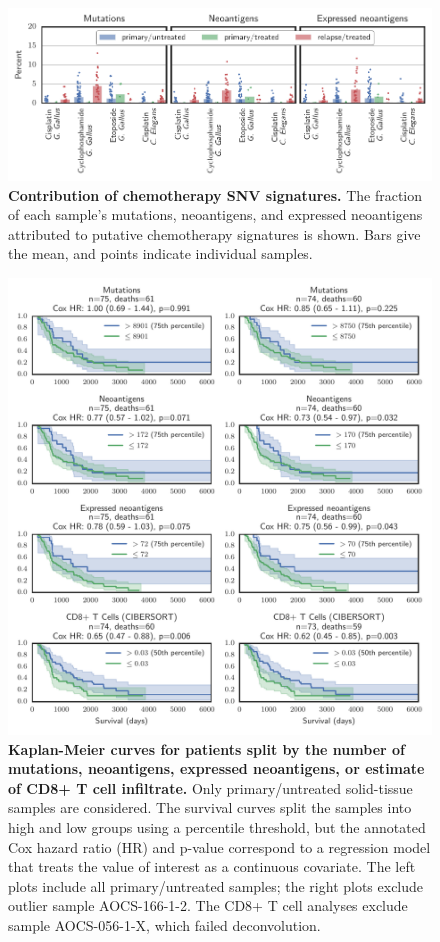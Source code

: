 \documentclass{article}
\begin{document}
\begin{figure}[htbp]
\centering
\includegraphics[scale=1.0]{../figures/sources_of_mutations_and_neoantigens_ungrouped.pdf}
\caption{\textbf{Contribution of chemotherapy SNV signatures.} The fraction of each sample's mutations, neoantigens, and expressed neoantigens attributed to putative chemotherapy signatures is shown. Bars give the mean, and points indicate individual samples.}
\label{fig:sourcesungrouped}
\end{figure}

\begin{figure}[htbp]
\centering
\includegraphics[scale=1.0]{../figures/survival.pdf}
\caption{\textbf{Kaplan-Meier curves for patients split by the number of mutations, neoantigens, expressed neoantigens, or estimate of CD8+ T cell infiltrate.} Only primary/untreated solid-tissue samples are considered. The survival curves split the samples into high and low groups using a percentile threshold, but the annotated Cox hazard ratio (HR) and p-value correspond to a regression model that treats the value of interest as a continuous covariate. The left plots include all primary/untreated samples; the right plots exclude outlier sample AOCS-166-1-2. The CD8+ T cell analyses exclude sample AOCS-056-1-X, which failed deconvolution.}
\label{fig:survival}
\end{figure}
\end{document}

